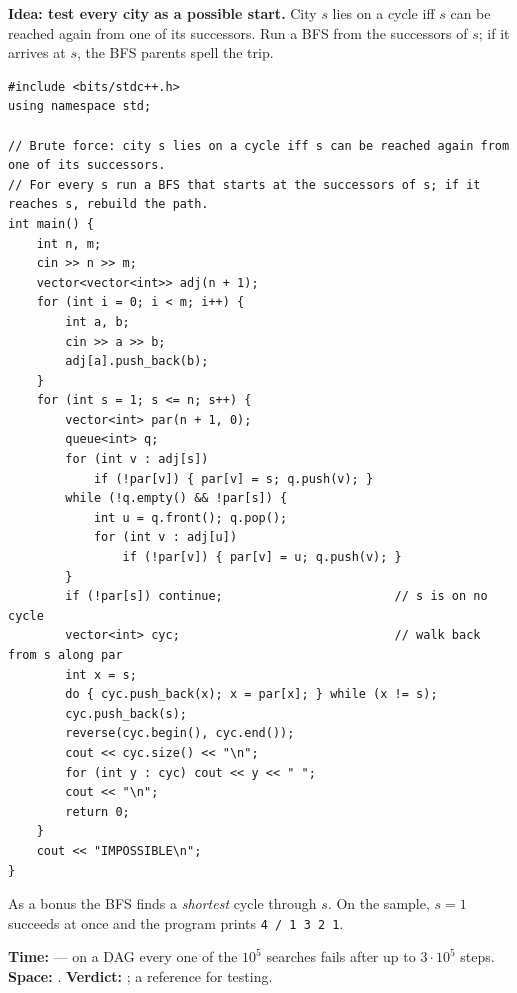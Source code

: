 \begin{bruteforcebox}
\textbf{Idea: test every city as a possible start.} City $s$ lies on a cycle iff $s$ can be reached again from one of its successors. Run a BFS from the successors of $s$; if it arrives at $s$, the BFS parents spell the trip.

\begin{lstlisting}[style=cpp]
#include <bits/stdc++.h>
using namespace std;

// Brute force: city s lies on a cycle iff s can be reached again from one of its successors.
// For every s run a BFS that starts at the successors of s; if it reaches s, rebuild the path.
int main() {
    int n, m;
    cin >> n >> m;
    vector<vector<int>> adj(n + 1);
    for (int i = 0; i < m; i++) {
        int a, b;
        cin >> a >> b;
        adj[a].push_back(b);
    }
    for (int s = 1; s <= n; s++) {
        vector<int> par(n + 1, 0);
        queue<int> q;
        for (int v : adj[s])
            if (!par[v]) { par[v] = s; q.push(v); }
        while (!q.empty() && !par[s]) {
            int u = q.front(); q.pop();
            for (int v : adj[u])
                if (!par[v]) { par[v] = u; q.push(v); }
        }
        if (!par[s]) continue;                        // s is on no cycle
        vector<int> cyc;                              // walk back from s along par
        int x = s;
        do { cyc.push_back(x); x = par[x]; } while (x != s);
        cyc.push_back(s);
        reverse(cyc.begin(), cyc.end());
        cout << cyc.size() << "\n";
        for (int y : cyc) cout << y << " ";
        cout << "\n";
        return 0;
    }
    cout << "IMPOSSIBLE\n";
}
\end{lstlisting}

As a bonus the BFS finds a \emph{shortest} cycle through $s$. On the sample, $s = 1$ succeeds at once and the program prints \texttt{4 / 1 3 2 1}.
\begin{complexitybox}
\textbf{Time:}  --- on a DAG every one of the $10^5$ searches fails after up to $3\cdot10^5$ steps. \textbf{Space:} . \textbf{Verdict:} \tle; a reference for testing.
\end{complexitybox}
\end{bruteforcebox}

